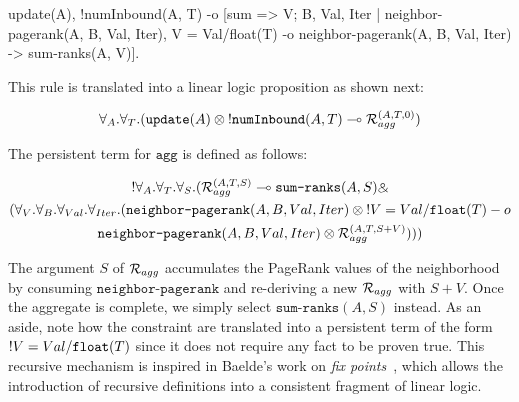 \begin{Code}
  update(A),
  !numInbound(A, T)
     -o [sum => V; B, Val, Iter | neighbor-pagerank(A, B, Val, Iter), V =
           Val/float(T) -o neighbor-pagerank(A, B, Val, Iter) -> sum-ranks(A, V)].
\end{Code}

This rule is translated into a linear logic proposition as shown next:

\begin{align}
\forall_{A}. \forall_{T}. (\texttt{update}(A) \otimes {!} \texttt{numInbound}(A, T) \multimap
\mathcal{R}_{agg}^{(A, T, 0)})
\end{align}

The persistent term for $\texttt{agg}$ is defined as follows:

\begin{multline}
{!} \forall_A. \forall_T. \forall_S. (\mathcal{R}_{agg}^{(A, T, S)} \multimap \texttt{sum-ranks}(A, S) \mathbin{\binampersand}\\
(\forall_V. \forall_B. \forall_{Val}. \forall_{Iter}.
   (\texttt{neighbor-pagerank}(A, B, Val, Iter) \otimes {!} V = Val/\texttt{float}(T) -o \\\texttt{neighbor-pagerank}(A, B, Val, Iter) \otimes \mathcal{R}_{agg}^{(A, T, S + V)})))
\end{multline}

The argument $S$ of $\mathcal{R}_{agg}$ accumulates the PageRank values of the
neighborhood by consuming $\texttt{neighbor-pagerank}$ and re-deriving a new
$\mathcal{R}_{agg}$ with $S + V$. Once the aggregate is complete, we simply select
$\texttt{sum-ranks}(A, S)$ instead. As an aside, note how the constraint are
translated into a persistent term of the form ${!} V = Val/\texttt{float}(T)$
since it does not require any fact to be proven true. This recursive mechanism
is inspired in Baelde's work on \emph{fix points}~\cite{BaeldeM07,Baelde:2012}, which allows
the introduction of recursive definitions into a consistent fragment of linear
logic.
